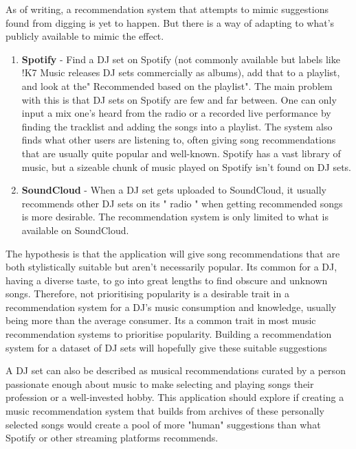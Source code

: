 As of writing, a recommendation system that attempts to mimic suggestions found from digging is yet to happen. But there is a way of adapting to what's publicly available to mimic the effect.

\begin{enumerate}
	\item \textbf{Spotify }- Find a DJ set on Spotify (not commonly available but labels like !K7 Music
	releases DJ sets commercially as albums), add that to a playlist, and look at the"
	Recommended based on the playlist". The main problem with this is that DJ sets on
	Spotify are few and far between. One can only input a mix one’s heard from the radio or
	a recorded live performance by finding the tracklist and adding the songs into a playlist.
	The system also finds what other users are listening to, often giving song recommendations
	that are usually quite popular and well-known. Spotify has a vast library of music, but a
	sizeable chunk of music played on Spotify isn’t found on DJ sets.
	
	\item \textbf{SoundCloud }- When a DJ set gets uploaded to SoundCloud, it usually recommends other DJ sets on its " radio " when getting recommended songs is more desirable. The recommendation system is only limited to what is available on SoundCloud.
	
\end{enumerate}
	
The hypothesis is that the application will give song recommendations that are both stylistically
suitable but aren’t necessarily popular. Its common for a DJ, having a diverse taste, to go into
great lengths to find obscure and unknown songs. Therefore, not prioritising popularity is a
desirable trait in a recommendation system for a DJ’s music consumption and knowledge, usually
being more than the average consumer. Its a common trait in most music recommendation
systems to prioritise popularity. Building a recommendation system for a dataset of DJ sets
will hopefully give these suitable suggestions	

A DJ set can also be described as musical recommendations curated by a person passionate
enough about music to make selecting and playing songs their profession or a well-invested
hobby. This application should explore if creating a music recommendation system that builds
from archives of these personally selected songs would create a pool of more "human"
suggestions than what Spotify or other streaming platforms recommends.




